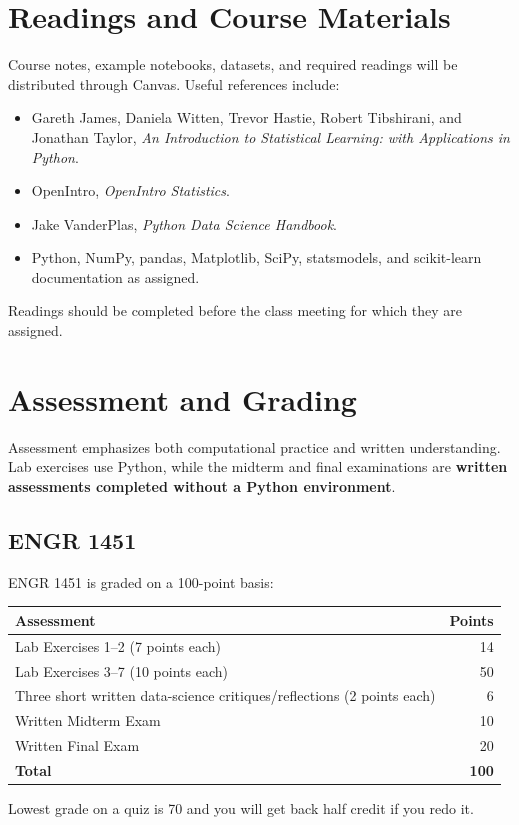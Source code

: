 \documentclass[11pt]{article}
\begin{document}
\section{Readings and Course Materials}

Course notes, example notebooks, datasets, and required readings will be distributed through Canvas. Useful references include:

\begin{itemize}
  \item Gareth James, Daniela Witten, Trevor Hastie, Robert Tibshirani, and Jonathan Taylor, \emph{An Introduction to Statistical Learning: with Applications in Python}.
  \item OpenIntro, \emph{OpenIntro Statistics}.
  \item Jake VanderPlas, \emph{Python Data Science Handbook}.
  \item Python, NumPy, pandas, Matplotlib, SciPy, statsmodels, and scikit-learn documentation as assigned.
\end{itemize}

Readings should be completed before the class meeting for which they are assigned.

\section{Assessment and Grading}

Assessment emphasizes both computational practice and written understanding. Lab exercises use Python, while the midterm and final examinations are \textbf{written assessments completed without a Python environment}. %

\subsection{ENGR 1451}

ENGR 1451 is graded on a 100-point basis:

\begin{center}
\begin{tabular}{@{}lr@{}}
\toprule
\textbf{Assessment} & \textbf{Points}\\
\midrule
Lab Exercises 1--2 (7 points each) & 14\\
Lab Exercises 3--7 (10 points each) & 50\\
Three short written data-science critiques/reflections (2 points each) & 6\\
Written Midterm Exam & 10\\
Written Final Exam & 20\\
\midrule
\textbf{Total} & \textbf{100}\\
\bottomrule
\end{tabular}

Lowest grade on a quiz is 70 and you will get back half credit if you redo it.  
\end{center}
\end{document}
